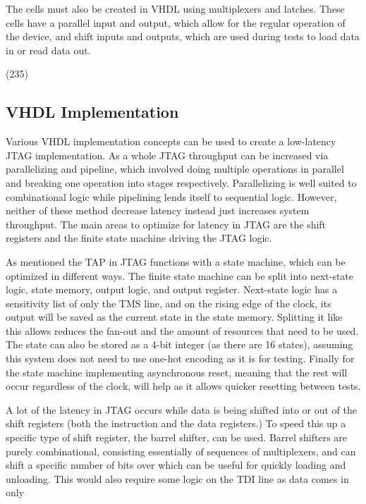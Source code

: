 \documentclass[11pt]{article}
\begin{document}
The cells must also be created in VHDL using multiplexers and latches. 
These cells have a parallel input and output, which allow for the regular operation of the device, and shift inputs and outputs, which are used during tests to load data in or read data out.

(235)


\subsection{VHDL Implementation}
Various VHDL implementation concepts can be used to create a low-latency JTAG implementation.
As a whole JTAG throughput can be increased via parallelizing and pipeline, which involved doing multiple operations in parallel and breaking one operation into stages respectively.
Parallelizing is well suited to combinational logic while pipelining lends itself to sequential logic.
However, neither of these method decrease latency instead just increases system throughput.
The main areas to optimize for latency in JTAG are the shift registers and the finite state machine driving the JTAG logic.

As mentioned the TAP in JTAG functions with a state machine, which can be optimized in different ways.
The finite state machine can be split into next-state logic, state memory, output logic, and output register.
Next-state logic has a sensitivity list of only the TMS line, and on the rising edge of the clock, its output will be saved as the current state in the state memory.
Splitting it like this allows reduces the fan-out and the amount of resources that need to be used.
The state can also be stored as a 4-bit integer (as there are 16 states), assuming this system does not need to use one-hot encoding as it is for testing.
Finally for the state machine implementing asynchronous reset, meaning that the rest will occur regardless of the clock, will help as it allows quicker resetting between tests.

A lot of the latency in JTAG occurs while data is being shifted into or out of the shift registers (both the instruction and the data registers.)
To speed this up a specific type of shift register, the barrel shifter, can be used.
Barrel shifters are purely combinational, consisting essentially of sequences of multiplexers, and can shift a specific number of bits over which can be useful for quickly loading and unloading.
This would also require some logic on the TDI line as data comes in only 
\end{document}
